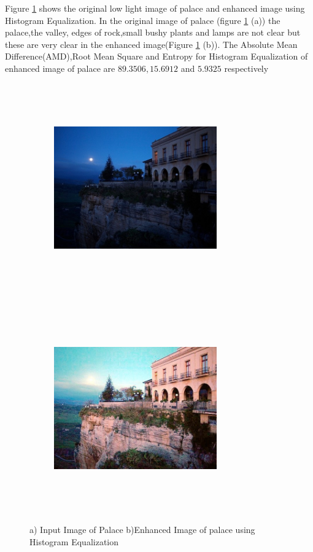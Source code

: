 Figure \ref{fig:palaceHistEq} shows the original low light image of palace and enhanced image using Histogram Equalization. In the original image of palace (figure \ref{fig:palaceHistEq} (a))  the palace,the valley, edges of rock,small bushy plants and lamps are not clear but these are very clear in the enhanced image(Figure \ref{fig:palaceHistEq} (b)). The Absolute Mean Difference(AMD),Root Mean Square and Entropy for Histogram Equalization of enhanced image of palace are $89.3506, 15.6912$ and $5.9325$ respectively      


\begin{figure}
	\begin{subfigure}{8cm}
		\centering    
    	\includegraphics[width=7cm,height=9cm,keepaspectratio]{images/ch5/palace_input.jpg}
    	\caption{} 
    \end{subfigure}
  	\begin{subfigure}{6cm}
  		\centering
  		\includegraphics[width=7cm,height=9cm,keepaspectratio]{images/ch5/palace_hist_equ.jpg}
   		\caption{}
  	\end{subfigure}
  	\caption{a) Input Image of Palace b)Enhanced Image of palace using Histogram Equalization}
  	\label{fig:palaceHistEq}
\end{figure}

